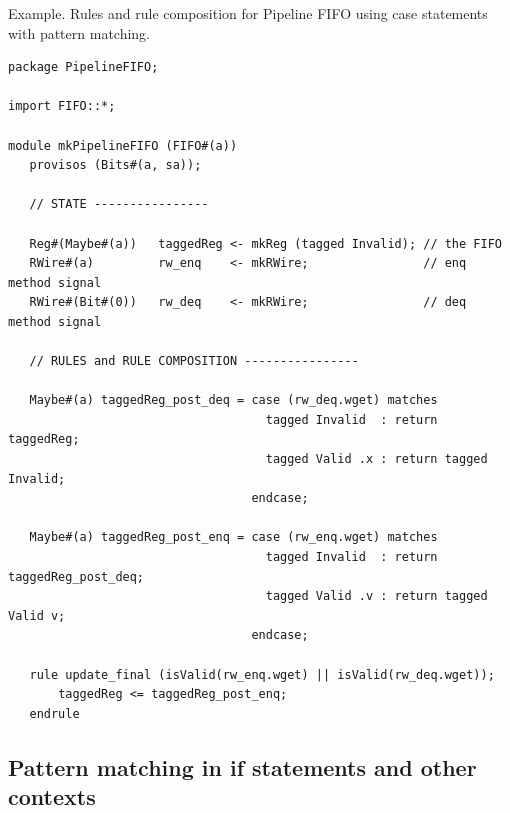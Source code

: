 \documentclass[twoside,letterpaper]{article}
\begin{document}
Example.  Rules and rule composition for Pipeline FIFO using case
statements with pattern matching.
\begin{verbatim}
package PipelineFIFO;

import FIFO::*;

module mkPipelineFIFO (FIFO#(a))
   provisos (Bits#(a, sa));

   // STATE ----------------
   
   Reg#(Maybe#(a))   taggedReg <- mkReg (tagged Invalid); // the FIFO
   RWire#(a)         rw_enq    <- mkRWire;                // enq method signal
   RWire#(Bit#(0))   rw_deq    <- mkRWire;                // deq method signal

   // RULES and RULE COMPOSITION ----------------
   
   Maybe#(a) taggedReg_post_deq = case (rw_deq.wget) matches
                                    tagged Invalid  : return taggedReg;
                                    tagged Valid .x : return tagged Invalid;
                                  endcase;

   Maybe#(a) taggedReg_post_enq = case (rw_enq.wget) matches
                                    tagged Invalid  : return taggedReg_post_deq;
                                    tagged Valid .v : return tagged Valid v;
                                  endcase;

   rule update_final (isValid(rw_enq.wget) || isValid(rw_deq.wget));
       taggedReg <= taggedReg_post_enq;
   endrule
\end{verbatim}

\subsection{Pattern matching in if statements and other contexts}

\label{sec-cond-stmt-patterns}
\end{document}
